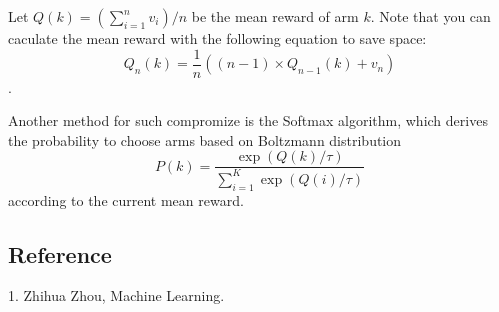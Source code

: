 Let $Q(k)=(\sum_{i=1}^n v_i)/n$ be the mean reward of arm $k$.  Note that you
can caculate the mean reward with the following equation to save space: $$Q_n
(k)=\frac{1}{n}((n-1)\times Q_{n-1}(k) + v_n)$$.

Another method for such compromize is the Softmax algorithm, which derives
the probability to choose arms based on Boltzmann distribution
$$ P(k)=\frac{\exp(Q(k)/\tau)}{\sum_{i=1}^K \exp(Q(i)/\tau)} $$
according to the current mean reward.

\subsection{Reference}

1. Zhihua Zhou, Machine Learning.

